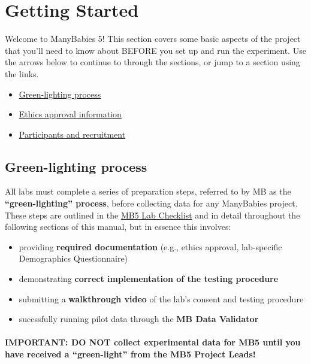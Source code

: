 \documentclass[
]{book}
\providecommand{\tightlist}{%
  \setlength{\itemsep}{0pt}\setlength{\parskip}{0pt}}
\begin{document}
\chapter{Getting Started}\label{getting-started}

Welcome to ManyBabies 5! This section covers some basic aspects of the project that you'll need to know about BEFORE you set up and run the experiment. Use the arrows below to continue to through the sections, or jump to a section using the links.

\begin{itemize}
\tightlist
\item
  \hyperref[green-lighting-process]{Green-lighting process}
\item
  \hyperref[ethics-approval]{Ethics approval information}
\item
  \hyperref[participants-and-recruitment]{Participants and recruitment}
\end{itemize}

\section{Green-lighting process}\label{green-lighting-process}

All labs must complete a series of preparation steps, referred to by MB as the \textbf{``green-lighting'' process}, before collecting data for any ManyBabies project. These steps are outlined in the \hyperref[mb5-lab-checklist]{MB5 Lab Checklist} and in detail throughout the following sections of this manual, but in essence this involves:

\begin{itemize}
\tightlist
\item
  providing \textbf{required documentation} (e.g., ethics approval, lab-specific Demographics Questionnaire)
\item
  demonstrating \textbf{correct implementation of the testing procedure}
\item
  submitting a \textbf{walkthrough video} of the lab's consent and testing procedure
\item
  sucessfully running pilot data through the \textbf{MB Data Validator}
\end{itemize}

\subsubsection*{IMPORTANT: DO NOT collect experimental data for MB5 until you have received a ``green-light'' from the MB5 Project Leads!}\label{important-do-not-collect-experimental-data-for-mb5-until-you-have-received-a-green-light-from-the-mb5-project-leads}
\end{document}
